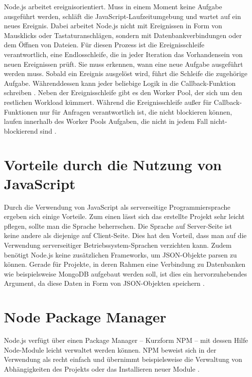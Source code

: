 Node.js arbeitet ereignisorientiert. Muss in einem Moment keine Aufgabe ausgeführt werden, schläft die JavaScript-Laufzeitumgebung und wartet auf ein neues Ereignis. Dabei arbeitet Node.js nicht mit Ereignissen in Form von Mausklicks oder Tastaturanschlägen, sondern mit Datenbankverbindungen oder dem Öffnen von Dateien. 
Für diesen Prozess ist die Ereignisschleife verantwortlich, eine Endlosschleife, die in jeder Iteration das Vorhandensein von neuen Ereignissen prüft. Sie muss erkennen, wann eine neue Aufgabe ausgeführt werden muss. Sobald ein Ereignis ausgelöst wird, führt die Schleife die zugehörige Aufgabe. Währenddessen kann jeder beliebige Logik in die Callback-Funktion schreiben \cite[S.3]{neins}.
Neben der Ereignisschleife gibt es den Worker Pool, der sich um den restlichen Workload kümmert. Während die Ereignisschleife außer für Callback-Funktionen nur für Anfragen verantwortlich ist, die nicht blockieren können, laufen innerhalb des Worker Pools Aufgaben, die nicht in jedem Fall nicht-blockierend sind \cite{dienstag}. 

\section{Vorteile durch die Nutzung von JavaScript}

Durch die Verwendung von JavaScript als serverseitige Programmiersprache ergeben sich einige Vorteile. Zum einen lässt sich das erstellte Projekt sehr leicht pflegen, sollte man die Sprache beherrschen. Die Sprache auf Server-Seite ist keine andere als diejenige auf Client-Seite. Dies hat den Vorteil, dass man auf die Verwendung serverseitiger Betriebssystem-Sprachen verzichten kann.
Zudem benötigt Node.js keine zusätzlichen Frameworks, um JSON-Objekte parsen zu können. Gerade für Projekte, in deren Rahmen eine Verbindung zu Datenbanken wie beispielsweise MongoDB aufgebaut werden soll, ist dies ein hervorzuhebendes Argument, da diese Daten in Form von JSON-Objekten speichern \cite[S.3]{neins}. 

\section{Node Package Manager}
Node.js verfügt über einen Package Manager – Kurzform NPM – mit dessen Hilfe Node-Module leicht verwaltet werden können. NPM beweist sich in der Verwendung als recht einfach und übernimmt beispielsweise die Verwaltung von Abhängigkeiten des Projekts oder das Installieren neuer Module \cite[S.10]{neins}. 

